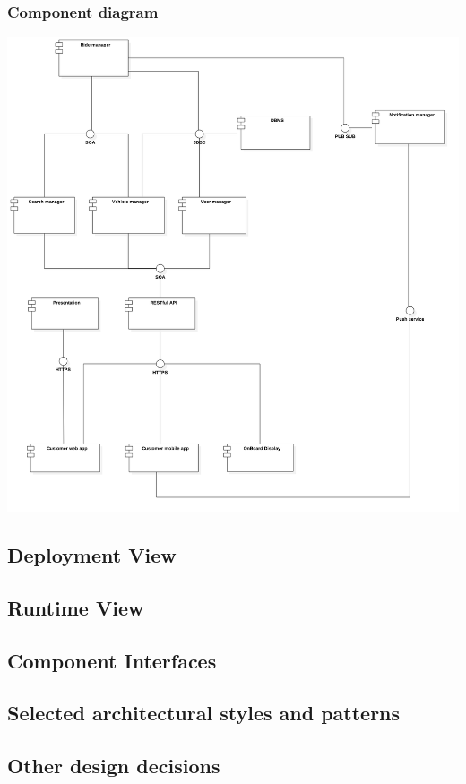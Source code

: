 \subsubsection{Component diagram}
\begin{center}
\includegraphics[scale=0.4]{Images/ComponentDiagram/ComponentDiagram.png}
\end{center}
\subsection{Deployment View}
\newpage
\subsection{Runtime View}
\newpage
\subsection{Component Interfaces}
\newpage
\subsection{Selected architectural styles and patterns}
\newpage
\subsection{Other design decisions}
\newpage